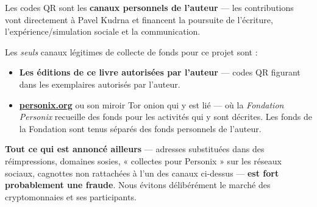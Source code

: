 \begin{minipage}[t]{0.60\textwidth}
\vspace{0pt}
\begin{mdframed}[
  linewidth=0.7pt,roundcorner=5pt,
  innerleftmargin=10pt,innerrightmargin=10pt,
  innertopmargin=8pt,innerbottommargin=8pt,
  skipabove=0pt,skipbelow=0pt,
  linecolor=cbwarning!50,backgroundcolor=cbwarning!5,
  nobreak=true,
  needspace=4\baselineskip,
]
\footnotesize
Les codes QR sont les \textbf{canaux personnels de l'auteur} --- les contributions vont directement à Pavel Kudrna et financent la poursuite de l'écriture, l'expérience/simulation sociale et la communication.

\smallskip
Les \emph{seuls} canaux légitimes de collecte de fonds pour ce projet sont :

\smallskip
\begin{itemize}
\setlength{\itemsep}{0pt}
\setlength{\topsep}{0pt}
\item \textbf{Les éditions de ce livre autorisées par l'auteur} --- codes QR figurant dans les exemplaires autorisés par l'auteur.
\item \href{https://personix.org}{\textbf{personix.org}} ou son miroir Tor onion qui y est lié --- où la \emph{Fondation Personix} recueille des fonds pour les activités qui y sont décrites. Les fonds de la Fondation sont tenus séparés des fonds personnels de l'auteur.
\end{itemize}

\smallskip
\textbf{Tout ce qui est annoncé ailleurs} --- adresses substituées dans des réimpressions, domaines sosies, « collectes pour Personix » sur les réseaux sociaux, cagnottes non rattachées à l'un des canaux ci-dessus --- \textbf{est fort probablement une fraude}. Nous évitons délibérément le marché des cryptomonnaies et ses participants.
\end{mdframed}
\end{minipage}

\clearpage
